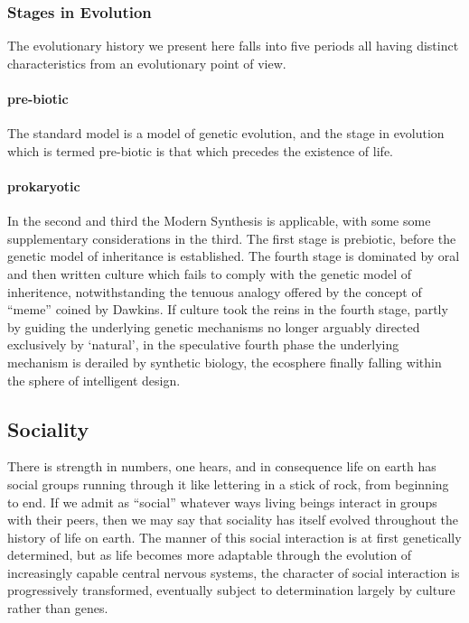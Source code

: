 \documentclass[10pt,titlepage]{book}
\begin{document}
\subsubsection{Stages in Evolution}

The evolutionary history we present here falls into five periods all having distinct characteristics from an evolutionary point of view.

\paragraph{pre-biotic}

The standard model is a model of genetic evolution, and the stage in evolution which is termed pre-biotic is that which precedes the existence of life.

\paragraph{prokaryotic}

In the second and third the Modern Synthesis is applicable, with some some supplementary considerations in the third.
The first stage is prebiotic, before the genetic model of inheritance is established.
The fourth stage is dominated by oral and then written culture which fails to comply with the genetic model of inheritence, notwithstanding the tenuous analogy offered by the concept of ``meme''
coined by Dawkins.
If culture took the reins in the fourth stage, partly by guiding the underlying genetic mechanisms no longer arguably directed exclusively by `natural', in the speculative fourth phase the underlying mechanism is derailed by synthetic biology, the ecosphere finally falling within the sphere of intelligent design.

\subsection{Sociality}

There is strength in numbers, one hears, and in consequence life on earth has social groups running through it like lettering in a stick of rock, from beginning to end.
If we admit as ``social'' whatever ways living beings interact in groups with their peers, then we may say that sociality has itself evolved throughout the history of life on earth.
The manner of this social interaction is at first genetically determined, but as life becomes more adaptable through the evolution of increasingly capable central nervous systems, the character of social interaction is progressively transformed, eventually subject to determination largely by culture rather than genes.
\end{document}
